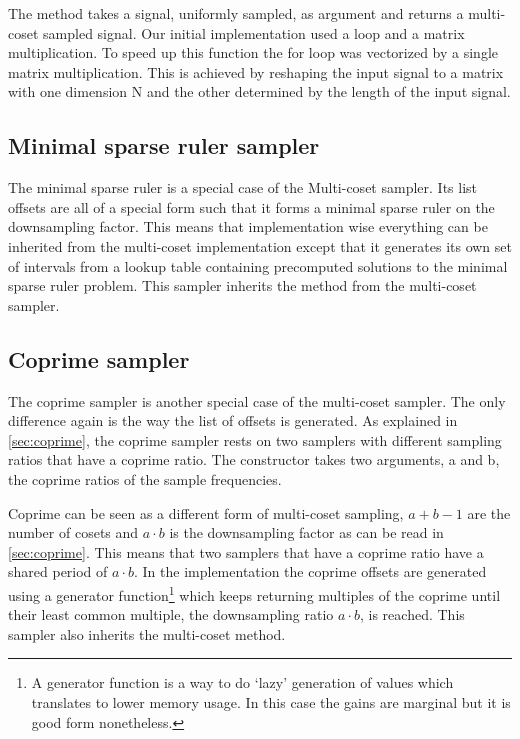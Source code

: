 \documentclass[a4paper, openany, oneside]{memoir}
\begin{document}
The method  takes a signal, uniformly sampled, as argument and returns a multi-coset sampled signal. Our initial implementation used a loop and a matrix multiplication. To speed up this function the for loop was vectorized by a single matrix multiplication. This is achieved by reshaping the input signal to a matrix with one dimension N and the other determined by the length of the input signal.

\subsection{Minimal sparse ruler sampler}
\label{sec:multi-coset-sampler}
The minimal sparse ruler is a special case of the Multi-coset sampler. Its list offsets are all of a special form such that it forms a minimal sparse ruler on the downsampling factor. This means that implementation wise everything can be inherited from the multi-coset implementation except that it generates its own set of intervals from a lookup table containing precomputed solutions to the minimal sparse ruler problem. This sampler inherits the  method from the multi-coset sampler.

\subsection{Coprime sampler}
\label{sec:coprime-sampler}
The coprime sampler is another special case of the multi-coset sampler. The only difference again is the way the list of offsets is generated. As explained in \cref{sec:coprime}, the coprime sampler rests on two samplers with different sampling ratios that have a coprime ratio. The constructor takes two arguments, a and b, the coprime ratios of the sample frequencies.

Coprime can be seen as a different form of multi-coset sampling, $a + b - 1$ are the number of cosets and $a \cdot b$ is the downsampling factor as can be read in \cref{sec:coprime}. This means that two samplers that have a coprime ratio have a shared period of $a \cdot b$.
In the implementation the coprime offsets are generated using a generator function\footnote{
    A generator function is a way to do `lazy' generation of values which translates to lower memory usage. In this case the gains are marginal but it is good form nonetheless.}
which keeps returning multiples of the coprime until their least common multiple, the downsampling ratio $a \cdot b$, is reached. This sampler also inherits the multi-coset  method.
\end{document}
